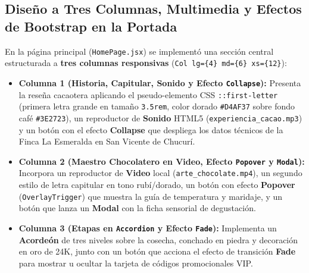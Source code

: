 \documentclass[12pt,letterpaper]{article}
\begin{document}
\subsection{Diseño a Tres Columnas, Multimedia y Efectos de Bootstrap en la Portada}
En la página principal (\texttt{HomePage.jsx}) se implementó una sección central estructurada a \textbf{tres columnas responsivas} (\texttt{Col lg=\{4\} md=\{6\} xs=\{12\}}):
\begin{itemize}[leftmargin=1.2cm]
  \item \textbf{Columna 1 (Historia, Capitular, Sonido y Efecto \texttt{Collapse}):} Presenta la reseña cacaotera aplicando el pseudo-elemento CSS \texttt{::first-letter} (primera letra grande en tamaño \texttt{3.5rem}, color dorado \texttt{\#D4AF37} sobre fondo café \texttt{\#3E2723}), un reproductor de \textbf{Sonido} HTML5 (\texttt{experiencia\_cacao.mp3}) y un botón con el efecto \textbf{Collapse} que despliega los datos técnicos de la Finca La Esmeralda en San Vicente de Chucurí.
  \item \textbf{Columna 2 (Maestro Chocolatero en Video, Efecto \texttt{Popover} y \texttt{Modal}):} Incorpora un reproductor de \textbf{Video} local (\texttt{arte\_chocolate.mp4}), un segundo estilo de letra capitular en tono rubí/dorado, un botón con efecto \textbf{Popover} (\texttt{OverlayTrigger}) que muestra la guía de temperatura y maridaje, y un botón que lanza un \textbf{Modal} con la ficha sensorial de degustación.
  \item \textbf{Columna 3 (Etapas en \texttt{Accordion} y Efecto \texttt{Fade}):} Implementa un \textbf{Acordeón} de tres niveles sobre la cosecha, conchado en piedra y decoración en oro de 24K, junto con un botón que acciona el efecto de transición \textbf{Fade} para mostrar u ocultar la tarjeta de códigos promocionales VIP.
\end{itemize}
\end{document}
